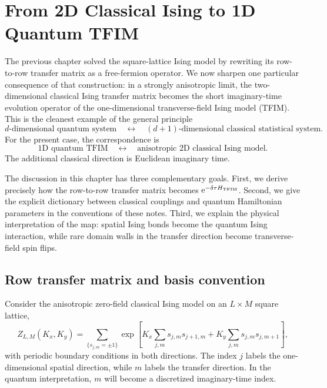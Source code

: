 \chapter{From 2D Classical Ising to 1D Quantum TFIM}
\label{chap:2d-ising-to-1d-tfim}

The previous chapter solved the square-lattice Ising model by rewriting its
row-to-row transfer matrix as a free-fermion operator.  We now sharpen one
particular consequence of that construction: in a strongly anisotropic limit,
the two-dimensional classical Ising transfer matrix becomes the short
imaginary-time evolution operator of the one-dimensional transverse-field Ising
model (TFIM).  This is the cleanest example of the general principle
\begin{equation}
\label{eq:ising-tfim-main-correspondence-schematic}
    d\text{-dimensional quantum system}
    \quad\longleftrightarrow\quad
    (d+1)\text{-dimensional classical statistical system}.
\end{equation}
For the present case, the correspondence is
\begin{equation}
    \text{1D quantum TFIM}
    \quad\longleftrightarrow\quad
    \text{anisotropic 2D classical Ising model}.
\end{equation}
The additional classical direction is Euclidean imaginary time.

The discussion in this chapter has three complementary goals.  First, we derive
precisely how the row-to-row transfer matrix becomes
$\mathrm{e}^{-\delta\tau H_{\rm TFIM}}$.  Second, we give the explicit dictionary between
classical couplings and quantum Hamiltonian parameters in the conventions of
these notes.  Third, we explain the physical interpretation of the map: spatial
Ising bonds become the quantum Ising interaction, while rare domain walls in the
transfer direction become transverse-field spin flips.

\section{Row transfer matrix and basis convention}
\label{sec:ising-tfim-row-transfer-review}

Consider the anisotropic zero-field classical Ising model on an $L\times M$
square lattice,
\begin{equation}
\label{eq:ising-tfim-classical-partition-function}
    Z_{L,M}(K_x,K_y)
    =
    \sum_{\{s_{j,m}=\pm1\}}
    \exp\left[
        K_x\sum_{j,m}s_{j,m}s_{j+1,m}
        +
        K_y\sum_{j,m}s_{j,m}s_{j,m+1}
    \right],
\end{equation}
with periodic boundary conditions in both directions.  The index $j$ labels the
one-dimensional spatial direction, while $m$ labels the transfer direction.  In
the quantum interpretation, $m$ will become a discretized imaginary-time index.

